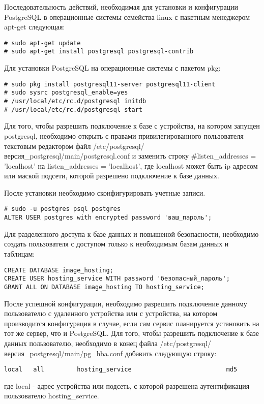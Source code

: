 Последовательность действий, необходимая для установки и конфигурации PostgreSQL в операционные системы семейства linux с пакетным менеджером apt-get следующая:
\begin{lstlisting}
# sudo apt-get update
# sudo apt-get install postgresql postgresql-contrib
\end{lstlisting}

Для установки PostgreSQL на операционные системы с пакетом pkg:
\begin{lstlisting}
# sudo pkg install postgresql11-server postgresql11-client
# sudo sysrc postgresql_enable=yes
# /usr/local/etc/rc.d/postgresql initdb
# /usr/local/etc/rc.d/postgresql start
\end{lstlisting}

Для того, чтобы разрешить подключение к базе с устройства, на котором запущен postgresql, необходимо открыть с правами привилегированного пользователя текстовым редактором файл /etc/postgresql/версия_postgresql/main/postgresql.conf и заменить строку \#listen_addresses = 'localhost' на listen_addresses = 'localhost', где localhost может быть ip адресом или маской подсети, которой разрешено подключение к базе данных.

После установки необходимо сконфигурировать учетные записи.
\begin{lstlisting}
# sudo -u postgres psql postgres
ALTER USER postgres with encrypted password 'ваш_пароль';
\end{lstlisting}
Для разделенного доступа к базе данных и повышеной безопасности, необходимо создать пользователя с доступом только к необходимым базам данных и таблицам:
\begin{lstlisting}
CREATE DATABASE image_hosting;
CREATE USER hosting_service WITH password 'безопасный_пароль';
GRANT ALL ON DATABASE image_hosting TO hosting_service;
\end{lstlisting}

После успешной конфигурации, необходимо разрешить подключение данному пользователю с удаленного устройства или с устройства, на котором производится конфигурация в случае, если сам сервис планируется установить на тот же сервер, что и PostgreSQL. Для того, чтобы разрешить подключение к базе данных пользователю, необходимо в конец файла /etc/postgresql/версия_postgresql/main/pg_hba.conf добавить следующую строку:
\begin{lstlisting}
local   all         hosting_service                          md5
\end{lstlisting}
где local - адрес устройства или подсеть, с которой разрешена аутентификация пользователю hosting_service.

